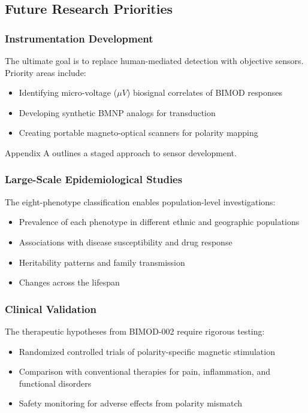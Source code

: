 \documentclass[12pt,a4paper]{article}
\begin{document}
\subsection{Future Research Priorities}

\subsubsection{Instrumentation Development}

The ultimate goal is to replace human-mediated detection with objective sensors. Priority areas include:

\begin{itemize}
    \item Identifying micro-voltage (\(\mu V\)) biosignal correlates of BIMOD responses
    \item Developing synthetic BMNP analogs for transduction
    \item Creating portable magneto-optical scanners for polarity mapping
\end{itemize}

Appendix A outlines a staged approach to sensor development.

\subsubsection{Large-Scale Epidemiological Studies}

The eight-phenotype classification enables population-level investigations:

\begin{itemize}
    \item Prevalence of each phenotype in different ethnic and geographic populations
    \item Associations with disease susceptibility and drug response
    \item Heritability patterns and family transmission
    \item Changes across the lifespan
\end{itemize}

\subsubsection{Clinical Validation}

The therapeutic hypotheses from BIMOD-002 \cite{yoon2026_002} require rigorous testing:

\begin{itemize}
    \item Randomized controlled trials of polarity-specific magnetic stimulation
    \item Comparison with conventional therapies for pain, inflammation, and functional disorders
    \item Safety monitoring for adverse effects from polarity mismatch
\end{itemize}
\end{document}
